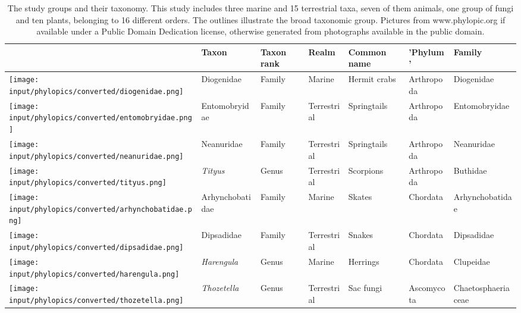 \documentclass[fleqn,10pt,lineno]{wlpeerj} %
\begin{document}
\begin{table}

\caption{\label{tab:tabletaxa}The study groups and their taxonomy. This study includes three marine and 15 terrestrial taxa, seven of them animals, one group of fungi and ten plants, belonging to 16 different orders. The outlines illustrate the broad taxonomic group. Pictures from www.phylopic.org if available under a Public Domain Dedication license, otherwise generated from photographs available in the public domain.}
\centering
\fontsize{11}{13}\selectfont
\begin{tabular}[t]{>{\raggedright\arraybackslash}p{1cm}>{\raggedright\arraybackslash}p{2.5cm}>{\raggedright\arraybackslash}p{1.5cm}>{\raggedright\arraybackslash}p{2cm}>{\raggedright\arraybackslash}p{2cm}>{\raggedright\arraybackslash}p{2cm}>{\raggedright\arraybackslash}p{3cm}}
\toprule
 & Taxon & Taxon rank & Realm & Common name & 'Phylum' & Family\\
\midrule
\texttt{[image: input/phylopics/converted/diogenidae.png]} & Diogenidae & Family & Marine & Hermit crabs & Arthropoda & Diogenidae\\
\texttt{[image: input/phylopics/converted/entomobryidae.png]} & Entomobryidae & Family & Terrestrial & Springtails & Arthropoda & Entomobryidae\\
\texttt{[image: input/phylopics/converted/neanuridae.png]} & Neanuridae & Family & Terrestrial & Springtails & Arthropoda & Neanuridae\\
\texttt{[image: input/phylopics/converted/tityus.png]} & \em{Tityus} & Genus & Terrestrial & Scorpions & Arthropoda & Buthidae\\
\texttt{[image: input/phylopics/converted/arhynchobatidae.png]} & Arhynchobatidae & Family & Marine & Skates & Chordata & Arhynchobatidae\\
\addlinespace
\texttt{[image: input/phylopics/converted/dipsadidae.png]} & Dipsadidae & Family & Terrestrial & Snakes & Chordata & Dipsadidae\\
\texttt{[image: input/phylopics/converted/harengula.png]} & \em{Harengula} & Genus & Marine & Herrings & Chordata & Clupeidae\\
\hline
\texttt{[image: input/phylopics/converted/thozetella.png]} & \em{Thozetella} & Genus & Terrestrial & Sac fungi & Ascomycota & Chaetosphaeriaceae\\

\end{tabular}
\end{table}
\end{document}
